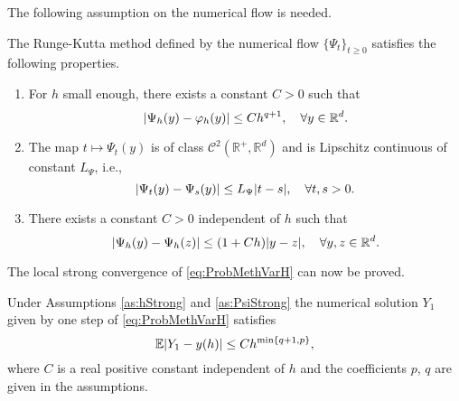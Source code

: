 \documentclass{siamart1116}
\numberwithin{theorem}{section}
\DeclarePairedDelimiter{\abs}{\lvert}{\rvert}
\renewcommand{\phi}{\varphi}
\newcommand{\R}{\mathbb{R}}
\newcommand{\E}{\operatorname{\mathbb{E}}}
\begin{document}
The following assumption on the numerical flow is needed.
\begin{assumption}\label{as:PsiStrong} The Runge-Kutta method defined by the numerical flow $\{\Psi_t\}_{t\geq 0}$ satisfies the following properties.
	\begin{enumerate}
		\item\label{as:PsiStrong_Order} For $h$ small enough, there exists a constant $C > 0$ such that
			\begin{equation}
				\abs{\Psi_h(y) - \phi_h(y)} \leq Ch^{q+1}, \quad \forall y \in \R^d.
			\end{equation}
		\item\label{as:PsiStrong_Time} The map $t \mapsto \Psi_t(y)$ is of class $\mathcal{C}^2(\R^+, \R^d)$ and is Lipschitz continuous of constant $L_\Psi$, i.e., 
			\begin{equation}\label{eq:LipschitzPsiT}
				\abs{\Psi_t(y) - \Psi_s(y)} \leq L_\Psi \abs{t - s}, \quad \forall t, s > 0.
			\end{equation}
		\item\label{as:PsiStrong_Space} There exists a constant $C > 0$ independent of $h$ such that 
			\begin{equation}\label{eq:LipschitzPsiY}
				\abs{\Psi_h(y) - \Psi_h(z)} \leq (1 + Ch) \abs{y - z}, \quad \forall y, z \in \R^d.
			\end{equation}
	\end{enumerate}
\end{assumption}
The local strong convergence of \eqref{eq:ProbMethVarH} can now be proved. 
\begin{theorem}\label{thm:StrongOrderLocal} Under Assumptions \ref{as:hStrong} and \ref{as:PsiStrong} the numerical solution $Y_1$ given by one step of \eqref{eq:ProbMethVarH} satisfies 
	\begin{equation}
	\E\abs{Y_1 - y(h)} \leq C h^{\min\{q + 1, p\}},
	\end{equation}
	where $C$ is a real positive constant independent of $h$ and the coefficients $p$, $q$ are given in the assumptions.
\end{theorem}
\end{document}
